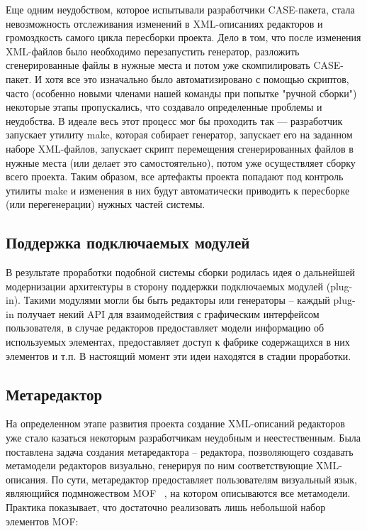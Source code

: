 \documentclass[a5paper]{article}
\begin{document}
Еще одним неудобством, которое испытывали разработчики CASE-пакета,
стала невозможность отслеживания изменений в XML-описаниях редакторов и
громоздкость самого цикла пересборки проекта. Дело в том, что после
изменения XML-файлов было необходимо перезапустить генератор, разложить
сгенерированные файлы в нужные места и потом уже скомпилировать
CASE-пакет. И хотя все это изначально было автоматизировано с помощью
скриптов, часто (особенно новыми членами нашей команды при попытке
"ручной сборки") некоторые этапы пропускались, что создавало
определенные проблемы и неудобства. В идеале весь этот процесс мог бы
проходить так –-- разработчик запускает утилиту make, которая собирает
генератор, запускает его на заданном наборе XML-файлов, запускает
скрипт перемещения сгенерированных файлов в нужные места (или делает
это самостоятельно), потом уже осуществляет сборку всего проекта. Таким
образом, все артефакты проекта попадают под контроль утилиты make и
изменения в них будут автоматически приводить к пересборке (или
перегенерации) нужных частей системы.

\subsection{Поддержка подключаемых модулей}

В результате проработки подобной системы сборки родилась идея о
дальнейшей модернизации архитектуры в сторону поддержки подключаемых
модулей (plug-in). Такими модулями могли бы быть редакторы или
генераторы – каждый plug-in получает некий API для взаимодействия с
графическим интерфейсом пользователя, в случае редакторов предоставляет
модели информацию об используемых элементах, предоставляет доступ к
фабрике содержащихся в них элементов и т.п. В настоящий момент эти идеи
находятся в стадии проработки.

\subsection{Метаредактор}

На определенном этапе развития проекта создание XML-описаний редакторов
уже стало казаться некоторым разработчикам неудобным и неестественным.
Была поставлена задача создания метаредактора – редактора, позволяющего
создавать метамодели редакторов визуально, генерируя по ним
соответствующие XML-описания. По сути, метаредактор предоставляет
пользователям визуальный язык, являющийся подмножеством
MOF~\cite{mof} , на котором описываются все
метамодели. Практика показывает, что достаточно реализовать лишь
небольшой набор элементов MOF: 
\end{document}
